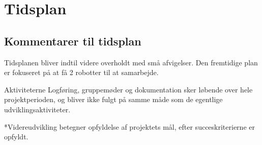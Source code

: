 \section{Tidsplan}

\clearpage
\subsection{Kommentarer til tidsplan}

Tidsplanen bliver indtil videre overholdt med små afvigelser. Den fremtidige plan er fokuseret på at få 2 robotter til at samarbejde.

Aktiviteterne Logføring, gruppemøder og dokumentation sker løbende over hele projektperioden, og bliver ikke fulgt på samme måde som de egentlige udviklingsaktiviteter.

*Videreudvikling betegner opfyldelse af projektets mål, efter succeskriterierne er opfyldt.